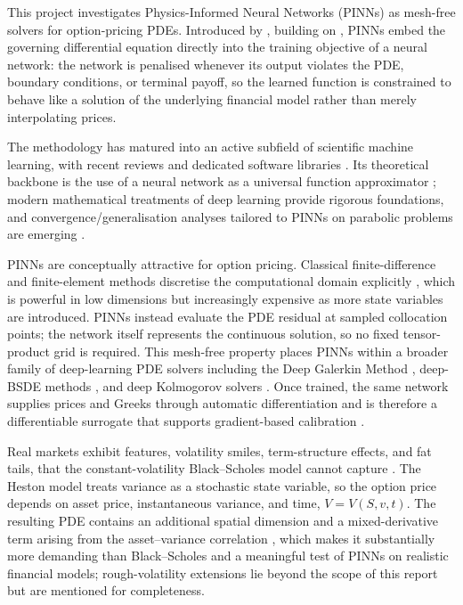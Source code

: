 This project investigates Physics-Informed Neural Networks (PINNs) as mesh-free solvers for option-pricing PDEs. Introduced by \textcite{raissi2019physics}, building on \parencite{raissi2017physics1}, PINNs embed the governing differential equation directly into the training objective of a neural network: the network is penalised whenever its output violates the PDE, boundary conditions, or terminal payoff, so the learned function is constrained to behave like a solution of the underlying financial model rather than merely interpolating prices. 

The methodology has matured into an active subfield of scientific machine learning, with recent reviews \parencite{karniadakis2021physics,cuomo2022scientific} and dedicated software libraries \parencite{lu2021deepxde}. Its theoretical backbone is the use of a neural network as a universal function approximator \parencite{cybenko1989approximation,hornik1989multilayer,pinkus1999approximation}; modern mathematical treatments of deep learning \parencite{jentzen2023mathintro,grohs2023mathematical,berner2021modern} provide rigorous foundations, and convergence/generalisation analyses tailored to PINNs on parabolic problems are emerging \parencite{shin2020convergence,mishra2022estimates}.

PINNs are conceptually attractive for option pricing. Classical finite-difference and finite-element methods discretise the computational domain explicitly \parencite{tavella2000pricing,achdou2005computational}, which is powerful in low dimensions but increasingly expensive as more state variables are introduced. PINNs instead evaluate the PDE residual at sampled collocation points; the network itself represents the continuous solution, so no fixed tensor-product grid is required. This mesh-free property places PINNs within a broader family of deep-learning PDE solvers including the Deep Galerkin Method \parencite{sirignano2018dgm}, deep-BSDE methods \parencite{han2018solving,e2017deep,beck2020deepbsde}, and deep Kolmogorov solvers \parencite{beck2021deep}. Once trained, the same network supplies prices and Greeks through automatic differentiation \parencite{baydin2018automatic,paszke2019pytorch} and is therefore a differentiable surrogate that supports gradient-based calibration \parencite{ruf2020neural,germain2021neural}.

Real markets exhibit features, volatility smiles, term-structure effects, and fat tails, that the constant-volatility Black--Scholes model cannot capture \parencite{gatheral2018volatility,fouque2011multiscale,hull2018options,wilmott1995mathematics}. The Heston model \parencite{heston1993closed} treats variance as a stochastic state variable, so the option price depends on asset price, instantaneous variance, and time, $V=V(S,v,t)$. The resulting PDE contains an additional spatial dimension and a mixed-derivative term arising from the asset--variance correlation \parencite{ekstrom2010bs}, which makes it substantially more demanding than Black--Scholes and a meaningful test of PINNs on realistic financial models; rough-volatility extensions \parencite{bayer2016rough,euch2019roughheston,euch2018perfect} lie beyond the scope of this report but are mentioned for completeness. 

